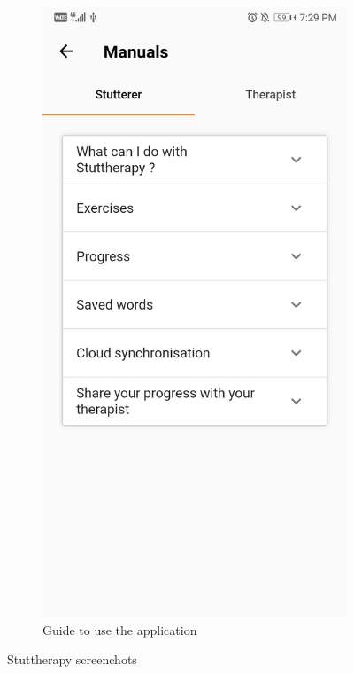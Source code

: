\begin{appendices}
\begin{landscape}
\begin{figure}[h]
\begin{subfigure}{.25\textwidth}
    \includegraphics[width=.75\linewidth]{content/imgs/screen16.jpg}
    \caption{Guide to use the application}
  \end{subfigure}


  \caption*{Stuttherapy screenchots}
\end{figure}

\end{landscape}




\end{appendices}
